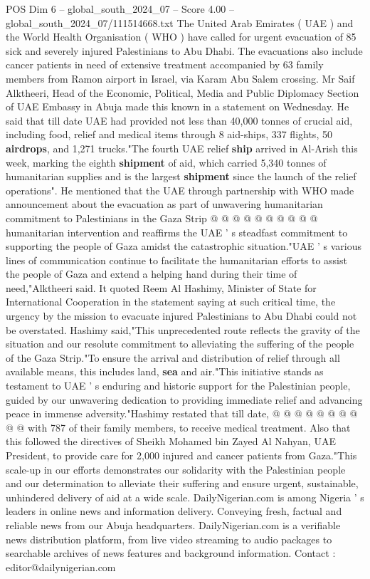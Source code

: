 \begin{textsample}{POS Dim 6 – global\_south\_2024\_07 – Score 4.00 – global\_south\_2024\_07/111514668.txt}  \label{ex:f6_pos_336}
The United Arab Emirates ( UAE ) and the World Health Organisation ( WHO ) have called for urgent evacuation of 85 sick and severely injured Palestinians to Abu Dhabi.
The evacuations also include cancer patients in need of extensive treatment accompanied by 63 family members from Ramon airport in Israel, via Karam Abu Salem crossing.
Mr Saif Alktheeri, Head of the Economic, Political, Media and Public Diplomacy Section of UAE Embassy in Abuja made this known in a statement on Wednesday.
He said that till date UAE had provided not less than 40,000 tonnes of crucial aid, including food, relief and medical items through 8 aid-ships, 337 flights, 50 \textbf{airdrops}, and 1,271 trucks."The fourth UAE relief \textbf{ship} arrived in Al-Arish this week, marking the eighth \textbf{shipment} of aid, which carried 5,340 tonnes of humanitarian supplies and is the largest \textbf{shipment} since the launch of the relief operations".
He mentioned that the UAE through partnership with WHO made announcement about the evacuation as part of unwavering humanitarian commitment to Palestinians in the Gaza Strip @ @ @ @ @ @ @ @ @ @ humanitarian intervention and reaffirms the UAE ' s steadfast commitment to supporting the people of Gaza amidst the catastrophic situation."UAE ' s various lines of communication continue to facilitate the humanitarian efforts to assist the people of Gaza and extend a helping hand during their time of need,"Alktheeri said.
It quoted Reem Al Hashimy, Minister of State for International Cooperation in the statement saying at such critical time, the urgency by the mission to evacuate injured Palestinians to Abu Dhabi could not be overstated.
Hashimy said,"This unprecedented route reflects the gravity of the situation and our resolute commitment to alleviating the suffering of the people of the Gaza Strip."To ensure the arrival and distribution of relief through all available means, this includes land, \textbf{sea} and air."This initiative stands as testament to UAE ' s enduring and historic support for the Palestinian people, guided by our unwavering dedication to providing immediate relief and advancing peace in immense adversity."Hashimy restated that till date, @ @ @ @ @ @ @ @ @ @ with 787 of their family members, to receive medical treatment.
Also that this followed the directives of Sheikh Mohamed bin Zayed Al Nahyan, UAE President, to provide care for 2,000 injured and cancer patients from Gaza."This scale-up in our efforts demonstrates our solidarity with the Palestinian people and our determination to alleviate their suffering and ensure urgent, sustainable, unhindered delivery of aid at a wide scale.
DailyNigerian.com is among Nigeria ' s leaders in online news and information delivery.
Conveying fresh, factual and reliable news from our Abuja headquarters.
DailyNigerian.com is a verifiable news distribution platform, from live video streaming to audio packages to searchable archives of news features and background information.
Contact : editor@dailynigerian.com

\end{textsample}
